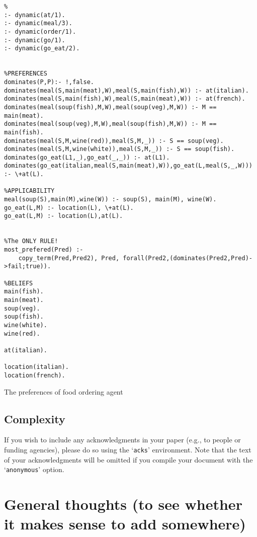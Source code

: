 \documentclass[sigconf,anonymous]{aamas}
\begin{document}
\begin{listing}[!h]
\centering
\begin{verbatim}
%
:- dynamic(at/1).
:- dynamic(meal/3).
:- dynamic(order/1).
:- dynamic(go/1).
:- dynamic(go_eat/2).


%PREFERENCES
dominates(P,P):- !,false.
dominates(meal(S,main(meat),W),meal(S,main(fish),W)) :- at(italian).
dominates(meal(S,main(fish),W),meal(S,main(meat),W)) :- at(french).
dominates(meal(soup(fish),M,W),meal(soup(veg),M,W)) :- M == main(meat).
dominates(meal(soup(veg),M,W),meal(soup(fish),M,W)) :- M == main(fish).
dominates(meal(S,M,wine(red)),meal(S,M,_)) :- S == soup(veg).
dominates(meal(S,M,wine(white)),meal(S,M,_)) :- S == soup(fish).
dominates(go_eat(L1,_),go_eat(_,_)) :- at(L1).
dominates(go_eat(italian,meal(S,main(meat),W)),go_eat(L,meal(S,_,W))) :- \+at(L).

%APPLICABILITY
meal(soup(S),main(M),wine(W)) :- soup(S), main(M), wine(W).
go_eat(L,M) :- location(L), \+at(L).
go_eat(L,M) :- location(L),at(L).


%The ONLY RULE!
most_prefered(Pred) :-
    copy_term(Pred,Pred2), Pred, forall(Pred2,(dominates(Pred2,Pred)->fail;true)).

%BELIEFS
main(fish).
main(meat).
soup(veg).
soup(fish).
wine(white).
wine(red).

at(italian).

location(italian).
location(french).

\end{verbatim}
    \caption{The preferences of food ordering agent}
    \label{lst:prefs_1}
\end{listing}


\subsection{Complexity}
\begin{acks}
If you wish to include any acknowledgments in your paper (e.g., to 
people or funding agencies), please do so using the `\texttt{acks}' 
environment. Note that the text of your acknowledgments will be omitted
if you compile your document with the `\texttt{anonymous}' option.
\end{acks}

\section*{General thoughts (to see whether it makes sense to add somewhere)}
\end{document}
